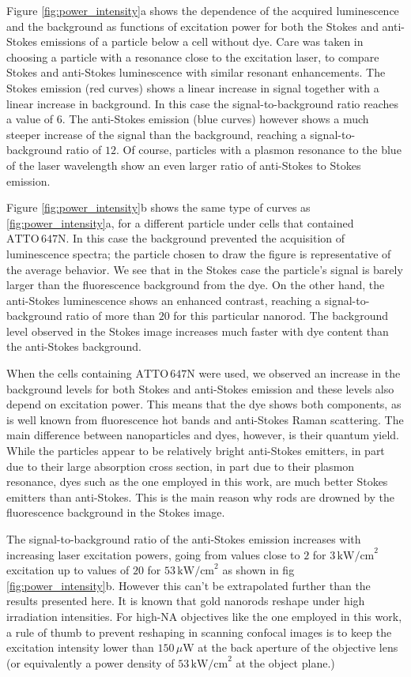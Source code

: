 \documentclass[journal=nalefd,manuscript=letter]{achemso}
\newcommand{\uW}{\ensuremath{\,\mu\textrm{W}}}
\newcommand{\pwr}{\ensuremath{\,\textrm{kW/cm}^2}}
\newcommand{\atto}{\ensuremath{\textrm{ATTO}\,647\textrm{N}}}
\begin{document}
Figure \ref{fig:power_intensity}a shows the dependence of the acquired
luminescence and the background as functions of excitation power for both the
Stokes and anti-Stokes emissions of a particle below a cell without dye. Care
was taken in choosing a particle with a resonance close to the excitation laser,
to compare Stokes and anti-Stokes luminescence with similar resonant
enhancements. The Stokes emission (red curves) shows a linear increase in signal
together with a linear increase in background. In this case the
signal-to-background ratio reaches a value of $6$. The anti-Stokes emission
(blue curves) however shows a much steeper increase of the signal than the
background, reaching a signal-to-background ratio of $12$. Of course, particles
with a plasmon resonance to the blue of the laser wavelength show an even larger
ratio of anti-Stokes to Stokes emission.

Figure \ref{fig:power_intensity}b shows the same type of curves as
\ref{fig:power_intensity}a, for a different particle under cells that contained
$\atto$. In this case the background prevented the acquisition of luminescence
spectra; the particle chosen to draw the figure is representative of the average
behavior. We see that in the Stokes case the particle's signal is barely larger
than the fluorescence background from the dye. On the other hand, the
anti-Stokes luminescence shows an enhanced contrast, reaching a
signal-to-background ratio of more than $20$ for this particular nanorod. The
background level observed in the Stokes image increases much faster with dye
content than the anti-Stokes background.

When the cells containing $\atto$ were used, we observed an increase in the
background levels for both Stokes and anti-Stokes emission and these levels also
depend on excitation power. This means that the dye shows both
components, as is well known from fluorescence hot bands and anti-Stokes Raman
scattering. The main difference between nanoparticles and dyes, however, is
their quantum yield. While the particles appear to be relatively bright
anti-Stokes emitters, in part due to their large absorption cross section, in
part due to their plasmon resonance, dyes such as the one employed in this work,
are much better Stokes emitters than anti-Stokes. This is the main reason why
rods are drowned by the fluorescence background in the Stokes image.

The signal-to-background ratio of the anti-Stokes emission increases with
increasing laser excitation powers, going from values close to $2$ for $3\pwr$
excitation up to values of $20$ for $53\pwr$ as shown in fig
\ref{fig:power_intensity}b. However this can't be extrapolated further than the
results presented here. It is known that gold nanorods reshape under high
irradiation intensities\cite{Liu2009}. For high-NA objectives like the one
employed in this work, a rule of thumb to prevent reshaping in scanning confocal images is to
keep the excitation intensity lower than $150\uW$ at the back aperture of the
objective lens (or equivalently a power density of $53\pwr$ at the object
plane.)
\end{document}
